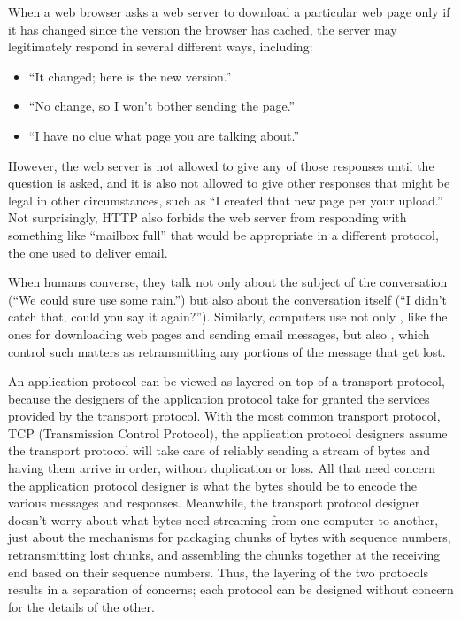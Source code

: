 When a web
browser asks a web server to download a particular web page only if it has
changed since the version the browser has cached, the server may
legitimately respond in several different ways, including:
\begin{itemize}
\item ``It changed; here is the new version.''
\item ``No change, so I won't bother sending the page.''
\item ``I have no clue what page you are talking about.''
\end{itemize}
However, the web server is not allowed to give any of those responses until the
question is asked, and it is also not allowed to give other responses that might be
legal in other circumstances, such as ``I created that new page per
your upload.''  Not surprisingly, HTTP also forbids the web server
from responding with something like
``mailbox full'' that would be appropriate in a different protocol,
the one used to deliver email.

When humans converse, they talk not only about the subject of the
conversation (``We could sure use some rain.'') but also about the
conversation itself (``I didn't catch that, could you say it again?'').
Similarly, computers use not only ,
like the ones for downloading web pages and sending email messages,
but also , which control such matters
as retransmitting any portions of the message that get lost.

An application protocol can be viewed as layered on top of a transport
protocol, because the designers of the application protocol take for
granted the services provided by the transport protocol.  With the
most common transport protocol, TCP (Transmission Control Protocol), the
application protocol designers assume the transport protocol will take
care of reliably sending a stream of bytes and having them arrive in
order, without duplication or loss.  All that need concern the
application protocol designer is what the bytes should be to encode
the various messages and responses.  Meanwhile, the transport protocol
designer doesn't worry about what bytes need streaming from one
computer to another, just about the mechanisms for packaging chunks of
bytes with sequence numbers, retransmitting lost chunks, and assembling
the chunks together at the receiving end based on their sequence
numbers.  Thus, the layering of the two protocols results in a
separation of concerns; each protocol can be designed without concern for
the details of the other.


